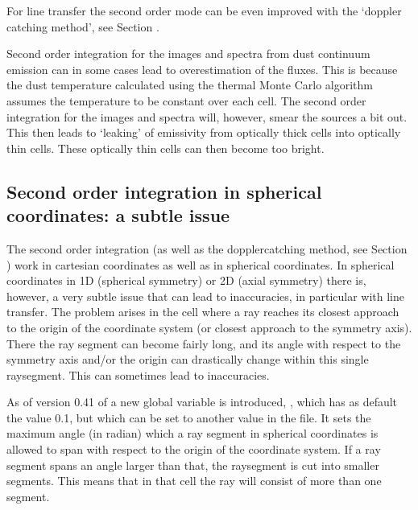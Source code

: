 \documentclass[letterpaper,10pt,english]{sphinxmanual}
\begin{document}
For line transfer the second order mode can be even improved with the
‘doppler catching method’, see Section {\hyperref[\detokenize{lineradtrans:sec-doppler-catching}]{}}.

 Second order integration for the images and spectra from dust
continuum emission can in some cases lead to overestimation of the fluxes.
This is because the dust temperature calculated using the thermal Monte
Carlo algorithm assumes the temperature to be constant over each cell. The
second order integration for the images and spectra will, however, smear the
sources a bit out. This then leads to ‘leaking’ of emissivity from
optically thick cells into optically thin cells. These optically thin cells
can then become too bright.


\subsection{Second order integration in spherical coordinates: a subtle issue}
\label{\detokenize{imagesspectra:second-order-integration-in-spherical-coordinates-a-subtle-issue}}\label{\detokenize{imagesspectra:sec-secord-spher}}
The second order integration (as well as the doppler\sphinxhyphen{}catching method, see
Section {\hyperref[\detokenize{lineradtrans:sec-doppler-catching}]{}}) work in cartesian coordinates as well as
in spherical coordinates. In spherical coordinates in 1\sphinxhyphen{}D (spherical
symmetry) or 2\sphinxhyphen{}D (axial symmetry) there is, however, a very subtle issue
that can lead to inaccuracies, in particular with line transfer. The problem
arises in the cell where a ray reaches its closest approach to the origin of
the coordinate system (or closest approach to the symmetry axis). There the
ray segment can become fairly long, and its angle with respect to the
symmetry axis and/or the origin can drastically change within this single
ray\sphinxhyphen{}segment. This can sometimes lead to inaccuracies.

As of version 0.41 of  a new global variable is
introduced, , which has as default the value 0.1,
but which can be set to another value in the  file.
It sets the maximum angle (in radian) which a ray segment in spherical
coordinates is allowed to span with respect to the origin of the coordinate
system. If a ray segment spans an angle larger than that, the ray\sphinxhyphen{}segment
is cut into smaller segments. This means that in that cell the ray will
consist of more than one segment.
\end{document}
